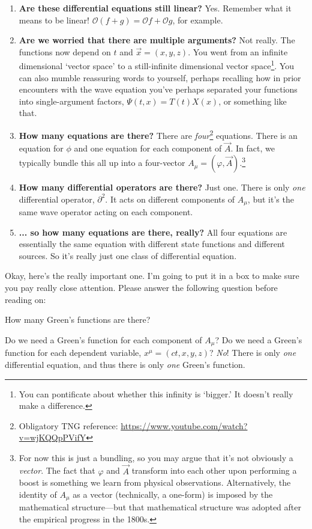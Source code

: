 \begin{enumerate}
\item \textbf{Are these differential equations still linear?} Yes. Remember what it means to be linear! $\mathcal O(f+g) = \mathcal Of +\mathcal Og$, for example.
\item \textbf{Are we worried that there are multiple arguments?} Not really. The functions now depend on $t$ and $\vec{x}=(x,y,z)$. You went from an infinite dimensional `vector space' to a still-infinite dimensional vector space\footnote{You can pontificate about whether this infinity is `bigger.' It doesn't really make a difference.}. You can also mumble reassuring words to yourself, perhaps recalling how in prior encounters with the wave equation you've perhaps separated your functions into single-argument factors, $\Psi(t,x) = T(t)X(x)$, or something like that.
\item \textbf{How many equations are there?} There are \emph{four}\footnote{Obligatory TNG reference: \url{https://www.youtube.com/watch?v=wjKQQpPVifY}} equations. There is an equation for $\phi$ and one equation for each component of $\vec A$. In fact, we typically bundle this all up into a four-vector $A_\mu=(\varphi, \vec A)$.\footnote{For now this is just a bundling, so you may argue that it's not obviously a \emph{vector}. The fact that $\varphi$ and $\vec{A}$ transform into each other upon performing a boost is something we learn from physical observations. Alternatively, the identity of $A_\mu$ as a vector (technically, a one-form) is imposed by the mathematical structure---but that mathematical structure was adopted after the empirical progress in the 1800s.}
\item \textbf{How many differential operators are there?} Just one. There is only \emph{one} differential operator, $\partial^2$. It acts on different components of $A_\mu$, but it's the same wave operator acting on each component. 
\item \textbf{... so how many equations are there, really?} All four equations are essentially the same equation with different state functions and different sources. So it's really just one class of differential equation.
\end{enumerate}
Okay, here's the really important one. I'm going to put it in a box to make sure you pay really close attention. Please answer the following question before reading on:
\begin{flipcomment}
\centering
How many Green's functions are there?
\end{flipcomment}
Do we need a Green's function for each component of $A_\mu$? Do we need a Green's function for each dependent variable, $x^\mu = (ct,x,y,z)$? \emph{No}! There is only \emph{one} differential equation, and thus there is only \emph{one} Green's function. 

